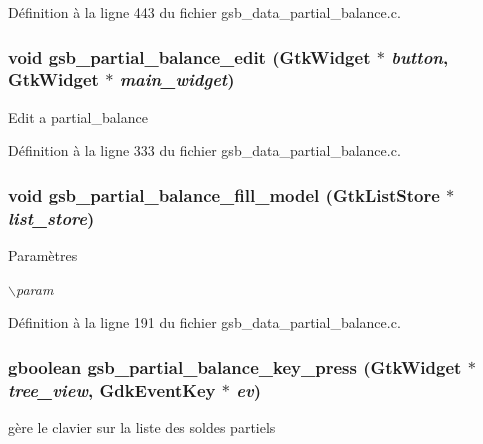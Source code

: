 Définition à la ligne 443 du fichier gsb\_\-data\_\-partial\_\-balance.c.

\subsubsection[{gsb\_\-partial\_\-balance\_\-edit}]{\setlength{\rightskip}{0pt plus 5cm}void gsb\_\-partial\_\-balance\_\-edit (GtkWidget $\ast$ {\em button}, \/  GtkWidget $\ast$ {\em main\_\-widget})}\label{gsb__data__partial__balance_8h_a2136465d129225b7cfef720d0880af2d}
Edit a partial\_\-balance 

Définition à la ligne 333 du fichier gsb\_\-data\_\-partial\_\-balance.c.

\subsubsection[{gsb\_\-partial\_\-balance\_\-fill\_\-model}]{\setlength{\rightskip}{0pt plus 5cm}void gsb\_\-partial\_\-balance\_\-fill\_\-model (GtkListStore $\ast$ {\em list\_\-store})}\label{gsb__data__partial__balance_8h_a3ad14b86fa26a4473be2c400d0dcb9e3}

\begin{DoxyParams}{Paramètres}
\item[{\em $\backslash$param}]\end{DoxyParams}


Définition à la ligne 191 du fichier gsb\_\-data\_\-partial\_\-balance.c.

\subsubsection[{gsb\_\-partial\_\-balance\_\-key\_\-press}]{\setlength{\rightskip}{0pt plus 5cm}gboolean gsb\_\-partial\_\-balance\_\-key\_\-press (GtkWidget $\ast$ {\em tree\_\-view}, \/  GdkEventKey $\ast$ {\em ev})}\label{gsb__data__partial__balance_8h_a76a78a9bfc49e4215ddbdd12c9de66a7}
gère le clavier sur la liste des soldes partiels 

